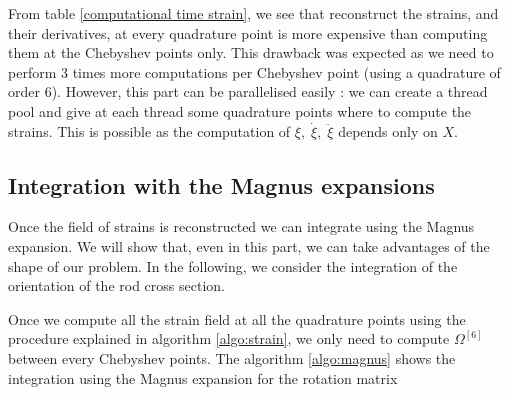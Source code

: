 \documentclass[12pt,a4paper]{article}
\begin{document}
	
From table \ref{computational time strain}, we see that reconstruct the strains, and their derivatives, at every quadrature point is more expensive than computing them at the Chebyshev points only. This drawback was expected as we need to perform 3 times more computations per Chebyshev point (using a quadrature of order 6). However, this part can be parallelised easily : we can create a thread pool and give at each thread some quadrature points where to compute the strains. This is possible as the computation of $\xi, \; \dot{\xi}, \; \ddot{\xi}$ depends only on $X$.

\subsection{Integration with the Magnus expansions}

Once the field of strains is reconstructed we can integrate using the Magnus expansion. We will show that, even in this part, we can take advantages of the shape of our problem. In the following, we consider the integration of the orientation of the rod cross section.

Once we compute all the strain field at all the quadrature points using the procedure explained in algorithm \ref{algo:strain}, we only need to compute $\Omega^{[6]}$ between every Chebyshev points. The algorithm \ref{algo:magnus} shows the integration using the Magnus expansion for the rotation matrix
\end{document}
